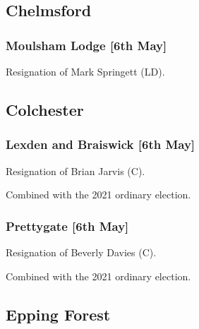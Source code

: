 \documentclass[a4paper,openany]{book}
\begin{document}
\begin{resultsiii}
\subsection*{Chelmsford}

\subsubsection*{Moulsham Lodge \hspace*{\fill}\nolinebreak[1]%
	\enspace\hspace*{\fill}
	[6th May]}


Resignation of Mark Springett (LD).

\subsection*{Colchester}

\subsubsection*{Lexden and Braiswick \hspace*{\fill}\nolinebreak[1]%
	\enspace\hspace*{\fill}
	[6th May]}


Resignation of Brian Jarvis (C).

Combined with the 2021 ordinary election.

\subsubsection*{Prettygate \hspace*{\fill}\nolinebreak[1]%
	\enspace\hspace*{\fill}
	[6th May]}


Resignation of Beverly Davies (C).

Combined with the 2021 ordinary election.

\subsection*{Epping Forest}


\end{resultsiii}
\end{document}
